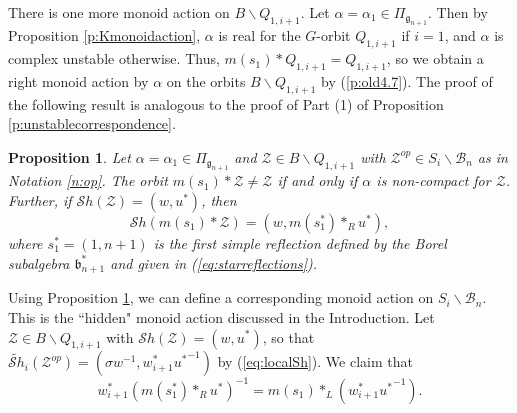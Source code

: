 \documentclass[12pt]{amsart}
\numberwithin{equation}{section}
\newtheorem{prop}[thm]{Proposition}
\newcommand{\cZ}{{\mathcal Z}}
\newcommand{\fg}{\mbox{${\mathfrak g}$}}
\newcommand{\fb}{\mbox{${\mathfrak b}$}}
\newcommand{\B}{\mathcal{B}}
\newcommand{\Sh}{\mathcal{S}h}
\begin{document}

 There is one more monoid action on $B\backslash Q_{1,i+1}$.  Let $\alpha=\alpha_{1}\in\Pi_{\fg_{n+1}}$.  Then by Proposition \ref{p:Kmonoidaction}, $\alpha$ is real for the 
 $G$-orbit $Q_{1,i+1}$ if $i=1$, and $\alpha$ is complex unstable otherwise.  Thus, $m(s_{1})*Q_{1,i+1}=Q_{1,i+1}$, so we obtain a right monoid action by $\alpha$ on the orbits $B\backslash Q_{1,i+1}$ by (\ref{p:old4.7}).  The proof of the following result is analogous to the proof of Part (1) of Proposition \ref{p:unstablecorrespondence}.
 \begin{prop}\label{p:alpha1corres}
 Let $\alpha=\alpha_{1}\in\Pi_{\fg_{n+1}}$ and $\cZ\in B\backslash Q_{1,i+1}$ with $\cZ^{op}\in S_{i}\backslash\B_{n}$ as in Notation \ref{n:op}.  
 The orbit $m(s_{1})*\cZ\neq \cZ$ if and only if $\alpha$ is non-compact for $\cZ$.  Further, if $\Sh(\cZ)=(w, u^{*})$, then 
 \begin{equation}\label{eq:2ndcptleft}
 \Sh(m(s_{1})*\cZ)=(w, m(s_{1}^{*})*_{R} u^{*}),
 \end{equation} 
 where $s_{1}^{*}=(1,n+1)$ is the first simple reflection defined by the Borel subalgebra $\fb_{n+1}^{*}$ and given in (\ref{eq:starreflections}).
  
 \end{prop}

Using Proposition \ref{p:alpha1corres}, we can define a corresponding monoid action on $S_{i}\backslash \B_{n}$. This is the ``hidden" monoid action discussed in the Introduction.
Let $\cZ\in B\backslash Q_{1,i+1}$ with $\Sh(\cZ)=(w,u^{*})$, so that $\widetilde{\Sh}_{i}(\cZ^{op})=(\sigma w^{-1}, w_{i+1}^{*} {u^{*}}^{-1})$ by (\ref{eq:localSh}).  
We claim that 
\begin{equation}\label{eq:2ndcptlefttoright}
w_{i+1}^{*}(m(s_{1}^{*})*_{R} u^{*})^{-1}=m(s_{1})*_{L} (w_{i+1}^{*} {u^{*}}^{-1}).
\end{equation}
\end{document}

